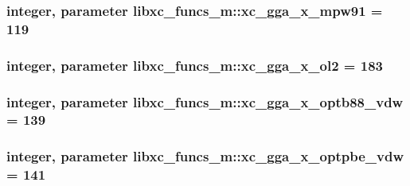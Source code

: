 \hypertarget{classlibxc__funcs__m_a50b1d21fd18cf6a21d617c73653fc4d2}{
\subsubsection[{xc\-\_\-gga\-\_\-x\-\_\-mpw91}]{\setlength{\rightskip}{0pt plus 5cm}integer, parameter libxc\-\_\-funcs\-\_\-m\-::xc\-\_\-gga\-\_\-x\-\_\-mpw91 = 119}}\label{classlibxc__funcs__m_a50b1d21fd18cf6a21d617c73653fc4d2}
\hypertarget{classlibxc__funcs__m_aeed8c201fee998f6efb1b57b711584a0}{
\subsubsection[{xc\-\_\-gga\-\_\-x\-\_\-ol2}]{\setlength{\rightskip}{0pt plus 5cm}integer, parameter libxc\-\_\-funcs\-\_\-m\-::xc\-\_\-gga\-\_\-x\-\_\-ol2 = 183}}\label{classlibxc__funcs__m_aeed8c201fee998f6efb1b57b711584a0}
\hypertarget{classlibxc__funcs__m_a3b3822519c43ac67a42c922e92671e68}{
\subsubsection[{xc\-\_\-gga\-\_\-x\-\_\-optb88\-\_\-vdw}]{\setlength{\rightskip}{0pt plus 5cm}integer, parameter libxc\-\_\-funcs\-\_\-m\-::xc\-\_\-gga\-\_\-x\-\_\-optb88\-\_\-vdw = 139}}\label{classlibxc__funcs__m_a3b3822519c43ac67a42c922e92671e68}
\hypertarget{classlibxc__funcs__m_abd63f747e9e042afa1b647a0d0bb6a70}{
\subsubsection[{xc\-\_\-gga\-\_\-x\-\_\-optpbe\-\_\-vdw}]{\setlength{\rightskip}{0pt plus 5cm}integer, parameter libxc\-\_\-funcs\-\_\-m\-::xc\-\_\-gga\-\_\-x\-\_\-optpbe\-\_\-vdw = 141}}\label{classlibxc__funcs__m_abd63f747e9e042afa1b647a0d0bb6a70}
